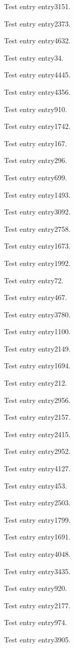 Test entry \gls{entry3151}.

Test entry \gls{entry2373}.

Test entry \gls{entry4632}.

Test entry \gls{entry34}.

Test entry \gls{entry4445}.

Test entry \gls{entry4356}.

Test entry \gls{entry910}.

Test entry \gls{entry1742}.

Test entry \gls{entry167}.

Test entry \gls{entry296}.

Test entry \gls{entry699}.

Test entry \gls{entry1493}.

Test entry \gls{entry3092}.

Test entry \gls{entry2758}.

Test entry \gls{entry1673}.

Test entry \gls{entry1992}.

Test entry \gls{entry72}.

Test entry \gls{entry467}.

Test entry \gls{entry3780}.

Test entry \gls{entry1100}.

Test entry \gls{entry2149}.

Test entry \gls{entry1694}.

Test entry \gls{entry212}.

Test entry \gls{entry2956}.

Test entry \gls{entry2157}.

Test entry \gls{entry2415}.

Test entry \gls{entry2952}.

Test entry \gls{entry4127}.

Test entry \gls{entry453}.

Test entry \gls{entry2503}.

Test entry \gls{entry1799}.

Test entry \gls{entry1691}.

Test entry \gls{entry4048}.

Test entry \gls{entry3435}.

Test entry \gls{entry920}.

Test entry \gls{entry2177}.

Test entry \gls{entry974}.

Test entry \gls{entry3905}.


